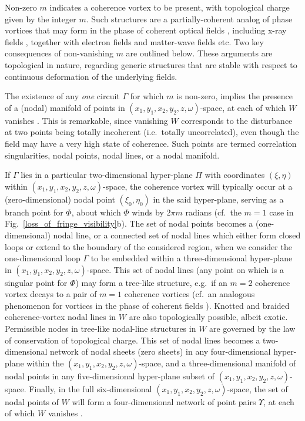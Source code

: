 \documentclass[%
 reprint,
 amsmath,amssymb,
 aps,
]{revtex4-1}
\begin{document}
Non-zero $m$ indicates a coherence vortex \cite{GburVisser2003} to be present, with topological charge given by the integer $m$.  Such structures are a partially-coherent analog of phase vortices that may form in the phase of coherent optical fields \cite{NyeBerry1974,Nye1999,SoskinVasnetsov2001,DennisProgOpt2009}, including x-ray fields \cite{XRayVortex1,XRayVortex2,XRayVortex3,XRayVortex4,paganin_book,XRayVortex5,XRayVortex6,XRayVortex7}, together with electron fields \cite{MessiahBook,AllenOxleyPaganin2001, Petersen2013, Bliokh2017} and matter-wave fields \cite{PitaevskiiStringariBook} etc.  Two key consequences of non-vanishing $m$ are outlined below.  These arguments are topological in nature, regarding generic structures that are stable with respect to continuous deformation of the underlying fields. 

The existence of any {\em one} circuit $\Gamma$ for which $m$ is non-zero, implies the presence of a (nodal) manifold of points in $(x_1,y_1,x_2,y_2,z,\omega)$-space, at each of which $W$ vanishes \cite{Marasinghe2010,Marasinghe2011}.  This is remarkable, since vanishing $W$ corresponds to the disturbance at two points being totally incoherent (i.e.~totally uncorrelated), even though the field may have a very high state of coherence. Such points are termed correlation singularities, nodal points, nodal lines, or a nodal manifold.  

If $\Gamma$ lies in a particular two-dimensional hyper-plane $\Pi$ with coordinates $(\xi,\eta)$ within $(x_1,y_1,x_2,y_2,z,\omega)$-space, the coherence vortex will typically occur at a (zero-dimensional) nodal point $(\xi_0,\eta_0)$ in the said hyper-plane, serving as a branch point for $\Phi$, about which $\Phi$ winds by $2 \pi m$ radians (cf.~the $m=1$ case in Fig.~\ref{loss_of_fringe_visibility}b).  The set of nodal points becomes a (one-dimensional) nodal line, or a connected set of nodal lines which either form closed loops or extend to the boundary of the considered region, when we consider the one-dimensional loop $\Gamma$ to be embedded within a three-dimensional hyper-plane in  $(x_1,y_1,x_2,y_2,z,\omega)$-space.  This set of nodal lines (any point on which is a singular point for $\Phi$) may form a tree-like structure, e.g.~if an $m=2$ coherence vortex decays to a pair of $m=1$ coherence vortices \cite{TopologicalReactionsCohVortices,GburSPIE} (cf.~an analogous phenomenon for vortices in the phase of coherent fields \cite{Freund1999}).  Knotted and braided coherence-vortex nodal lines in $W$ are also topologically possible, albeit exotic.  Permissible nodes in tree-like nodal-line structures in $W$ are governed by the law of conservation of topological charge.  This set of nodal lines becomes a two-dimensional network of nodal sheets (zero sheets) in any four-dimensional hyper-plane within the $(x_1,y_1,x_2,y_2,z,\omega)$-space, and a three-dimensional manifold of nodal points in any five-dimensional hyper-plane subset of $(x_1,y_1,x_2,y_2,z,\omega)$-space.  Finally, in the full six-dimensional $(x_1,y_1,x_2,y_2,z,\omega)$-space, the set of nodal points of $W$ will form a four-dimensional network of point pairs $\Upsilon$, at each of which $W$ vanishes \cite{Marasinghe2010}. 
\end{document}
